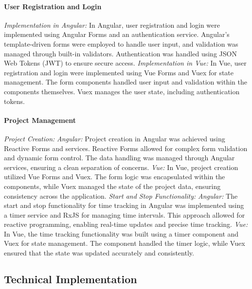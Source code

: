 \documentclass[conference]{IEEEtran}
\begin{document}
\paragraph{User Registration and Login}
\textit{Implementation in Angular: }In Angular, user registration and login were implemented using Angular Forms and an authentication service. Angular's template-driven forms were employed to handle user input, and validation was managed through built-in validators. Authentication was handled using JSON Web Tokens (JWT) to ensure secure access.\newline
\newline\textit{Implementation in Vue: }In Vue, user registration and login were implemented using Vue Forms and Vuex for state management. The form components handled user input and validation within the components themselves. Vuex manages the user state, including authentication tokens.
\paragraph{Project Management}
\textit{Project Creation:\newline}
\textit{Angular: }Project creation in Angular was achieved using Reactive Forms and services. Reactive Forms allowed for complex form validation and dynamic form control. The data handling was managed through Angular services, ensuring a clean separation of concerns.
\newline\textit{Vue: }In Vue, project creation utilized Vue Forms and Vuex. The form logic was encapsulated within the components, while Vuex managed the state of the project data, ensuring consistency across the application.
\newline\newline
\textit{Start and Stop Functionality:\newline}
\textit{Angular: }The start and stop functionality for time tracking in Angular was implemented using a timer service and RxJS for managing time intervals. This approach allowed for reactive programming, enabling real-time updates and precise time tracking.
\newline\textit{Vue: }In Vue, the time tracking functionality was built using a timer component and Vuex for state management. The component handled the timer logic, while Vuex ensured that the state was updated accurately and consistently.
\subsection{Technical Implementation}
\end{document}
